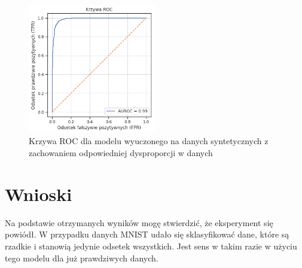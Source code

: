 \begin{figure}[h!]
    \centering
    \includegraphics[width=0.5\textwidth]{images/mnist_roc_v2}
    \caption{Krzywa ROC dla modelu wyuczonego na danych syntetycznych z zachowaniem odpowiedniej dysproporcji w danych}
    \label{fig:mnist_roc}
\end{figure}

\section{Wnioski}

Na podstawie otrzymanych wyników mogę stwierdzić, że eksperyment się powiódł. W przypadku danych MNIST udało się sklasyfikować dane, które są rzadkie i stanowią jedynie odsetek wszystkich. Jest sens w takim razie w użyciu tego modelu dla już prawdziwych danych.
